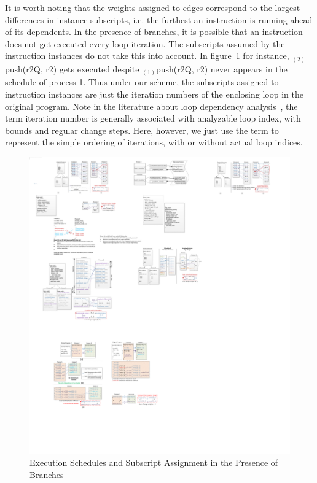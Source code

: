 It is worth noting that the weights assigned to edges correspond to the largest differences
in instance subscripts, i.e. the furthest an instruction is running
ahead of its dependents. In the presence of branches, it is possible that
an instruction does not get executed every loop iteration. The subscripts
assumed by the instruction instances do not take this into account. In figure~\ref{fig:exeSche}
for instance, $_{(2)}$push(r2Q, r2) gets executed despite $_{(1)}$push(r2Q, r2) 
never appears in the schedule of process 1.
Thus under our scheme, the subscripts assigned to instruction instances
are just the iteration numbers of the enclosing loop in the original program.
Note in the literature about loop dependency analysis~\cite{Kennedy:2001:OCM:502981}, the term iteration number is generally associated with analyzable loop index, with
bounds and regular change steps. Here, however, we just use the term to represent the simple ordering of iterations, with or without actual loop indices.
\begin{figure}[htp]
\begin{center}
\includegraphics[width=0.7\linewidth]{chap4fig/executionSchedules.pdf}
\caption{Execution Schedules and Subscript Assignment in the Presence of Branches
\label{fig:exeSche}}
\end{center}
\end{figure}





